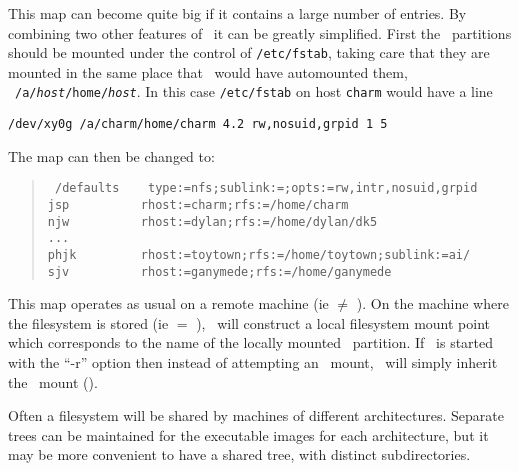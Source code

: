 This map can become quite big if it contains a large number of
entries.  By combining two other features of \amd\ it can be greatly
simplified.  First the \UFS\ partitions should be mounted under the
control of {\tt /etc/fstab}, taking care that they are mounted in the
same place that \amd\ would have automounted them, {\ie\ {\tt /a/{\em host}/home/{\em host}}}.
In this case {\tt /etc/fstab} on host {\tt charm} would have a line
\begin{verbatim}
/dev/xy0g /a/charm/home/charm 4.2 rw,nosuid,grpid 1 5
\end{verbatim}
The map can then be changed to:
\begin{quote}\raggedright
\tt
/defaults\ \ \ \ type:=nfs;sublink:=;opts:=rw,intr,nosuid,grpid\\
jsp\ \ \ \ \ \ \ \ \ \ rhost:=charm;rfs:=/home/charm\\
njw\ \ \ \ \ \ \ \ \ \ rhost:=dylan;rfs:=/home/dylan/dk5\\
...\\
phjk\ \ \ \ \ \ \ \ \ rhost:=toytown;rfs:=/home/toytown;sublink:=ai/\\
sjv\ \ \ \ \ \ \ \ \ \ rhost:=ganymede;rfs:=/home/ganymede
\end{quote}

This map operates as usual on a remote machine (ie  $\not=$ ).
On the machine where the filesystem is stored (ie  $=$ ),
\amd\ will construct a local filesystem mount point which corresponds to
the name of the locally mounted \UFS\ partition.  If \amd\ is started
with the ``-r'' option then instead of attempting an \NFS\ mount, \amd\ will
simply inherit the \UFS\ mount (\see {}).


Often a filesystem will be shared by machines of different architectures.
Separate trees can be maintained for the executable images for each
architecture, but it may be more convenient to have a shared tree,
with distinct subdirectories.

